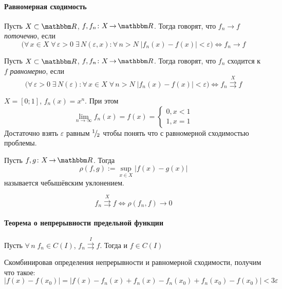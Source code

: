 \documentclass[12pt]{../../notes}
\begin{document}
\paragraph{Равномерная сходимость}
\begin{defn}\label{defn:pointconv}
  Пусть $X \subset \R$, $f, f_n\colon X\to \R$. Тогда говорят, что $f_n \to f$ \emph{поточечно}, если
  \[
    \Big( 
      \forall\, x\in X \; \forall\, \varepsilon > 0 \; \exists\, N(\varepsilon,x) :
      \forall\, n > N \; |f_n(x) - f(x)| < \varepsilon  
    \Big) \Leftrightarrow
    f_n \to f
  \]
\end{defn}

\begin{defn}\label{defn:uniconv}
  Пусть $X \subset \R$, $f, f_n\colon X\to \R$. Тогда говорят, что $f_n$ сходится к $f$ \emph{равномерно}, если
  \[
    \Big( 
      \forall\, \varepsilon > 0 \; \exists\, N(\varepsilon) :
      \forall\, x \in X \; \forall\, n > N \; |f_n(x) - f(x)| < \varepsilon  
    \Big) \Leftrightarrow
    f_n \overset{X}{\rightrightarrows} f
  \]
\end{defn}
\begin{exmp*}
  $X = [0;1]$, $f_n(x) = x^n$. При этом
  \[
    \lim_{n\to \infty} f_n(x) = f(x) 
    = \begin{cases}
        0, x < 1 \\
        1, x = 1
      \end{cases}
  \]
  Достаточно взять $\varepsilon$ равным ${}^{1}\!/_{\!2}$ чтобы понять что с равномерной сходимостью проблемы.
\end{exmp*}

\begin{defn}\label{defn:tchdev}
  Пусть $f,g\colon X \to \R$. Тогда 
  \[
    \rho(f,g):= \sup_{x\in X} |f(x) - g(x)|
  \]
  называется чебышёвским уклонением.
\end{defn}

\begin{stat}\label{stat:uniconvsign}
  \[
    f_n \overset{X}{\rightrightarrows} f \Leftrightarrow \rho(f_n, f) \to 0
  \]
\end{stat}

\paragraph{Теорема о непрерывности предельной функции}
\begin{thrm}\label{thrm:uniconvcont}
  Пусть $\forall\, n \; f_n \in C(I)$, $f_n \overset{I}{\rightrightarrows} f$. Тогда и $f \in C(I)$
\end{thrm}
\begin{ittproof}
  Скомбинировав определения непрерывности и равномерной сходимости, получим что такое:
  \[
    |f(x) - f(x_0)| = |f(x) - f_n(x) + f_n(x) - f_n(x_0) + f_n(x_0) - f(x_0)| < 3\varepsilon
  \]
\end{ittproof}
\end{document}
